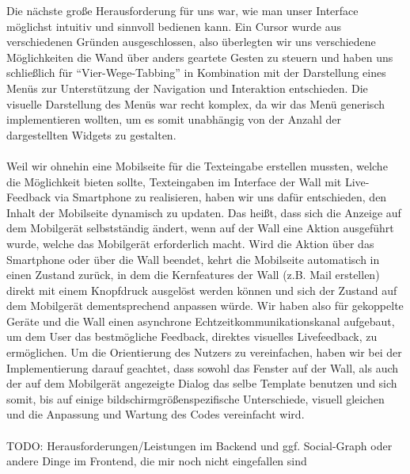 \documentclass[10pt,a4paper]{report}
\begin{document}
	Die nächste große Herausforderung für uns war, wie man unser Interface möglichst intuitiv und sinnvoll bedienen kann. Ein Cursor wurde aus verschiedenen Gründen ausgeschlossen, also überlegten wir uns verschiedene Möglichkeiten die Wand über anders geartete Gesten zu steuern und haben uns schließlich für "`Vier-Wege-Tabbing"' in Kombination mit der Darstellung eines Menüs zur Unterstützung der Navigation und Interaktion entschieden. Die visuelle Darstellung des Menüs war recht komplex, da wir das Menü generisch implementieren wollten, um es somit unabhängig von der Anzahl der dargestellten Widgets zu gestalten.\\\\
	Weil wir ohnehin eine Mobilseite für die Texteingabe erstellen mussten, welche die Möglichkeit bieten sollte, Texteingaben im Interface der Wall mit Live-Feedback via Smartphone zu realisieren, haben wir uns dafür entschieden, den Inhalt der Mobilseite dynamisch zu updaten. Das heißt, dass sich die Anzeige auf dem Mobilgerät selbstständig ändert, wenn auf der Wall eine Aktion ausgeführt wurde, welche das Mobilgerät erforderlich macht. Wird die Aktion über das Smartphone oder über die Wall beendet, kehrt die Mobilseite automatisch in einen Zustand zurück, in dem die Kernfeatures der Wall (z.B. Mail erstellen) direkt mit einem Knopfdruck ausgelöst werden können und sich der Zustand auf dem Mobilgerät dementsprechend anpassen würde. Wir haben also für gekoppelte Geräte und die Wall einen asynchrone Echtzeitkommunikationskanal aufgebaut, um dem User das bestmögliche Feedback, direktes visuelles Livefeedback, zu ermöglichen. Um die Orientierung des Nutzers zu vereinfachen, haben wir bei der Implementierung darauf geachtet, dass sowohl das Fenster auf der Wall, als auch der auf dem Mobilgerät angezeigte Dialog das selbe Template benutzen und sich somit, bis auf einige bildschirmgrößenspezifische Unterschiede, visuell gleichen und die Anpassung und Wartung des Codes vereinfacht wird.\\\\
	TODO: Herausforderungen/Leistungen im Backend und ggf. Social-Graph oder andere Dinge im Frontend, die mir noch nicht eingefallen sind
\end{document}

